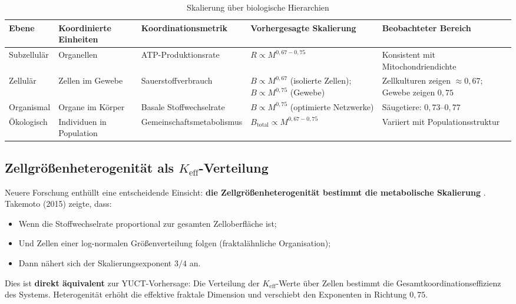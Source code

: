\documentclass[12pt]{article}
\newcommand{\Keff}{K_{\mathrm{eff}}}
\begin{document}
	\begin{table}[htbp]
		\centering
		\caption{Skalierung über biologische Hierarchien}
		\label{tab:hierarchical-scaling}
		\begin{tabular}{p{3cm} p{3cm} p{3.5cm} p{2.5cm} p{3cm}}
			\toprule
			\textbf{Ebene} & \textbf{Koordinierte Einheiten} & \textbf{Koordinationsmetrik} & \textbf{Vorhergesagte Skalierung} & \textbf{Beobachteter Bereich} \\
			\midrule
			Subzellulär & Organellen & ATP-Produktionsrate & \(R \propto M^{0,67-0,75}\) & Konsistent mit Mitochondriendichte \cite{West2002} \\
			Zellulär & Zellen im Gewebe & Sauerstoffverbrauch & \(B \propto M^{0,67}\) (isolierte Zellen); \(B \propto M^{0,75}\) (Gewebe) & Zellkulturen zeigen \(\approx 0,67\); Gewebe zeigen \(0,75\) \cite{West2002} \\
			Organismal & Organe im Körper & Basale Stoffwechselrate & \(B \propto M^{0,75}\) (optimierte Netzwerke) & Säugetiere: \(0,73\)–\(0,77\) \cite{Kleiber1932} \\
			Ökologisch & Individuen in Population & Gemeinschaftsmetabolismus & \(B_{\text{total}} \propto M^{0,67-0,75}\) & Variiert mit Populationsstruktur \cite{Glazier2005} \\
			\bottomrule
		\end{tabular}
	\end{table}
	
	\subsection{Zellgrößenheterogenität als \(\Keff\)-Verteilung}
	
	Neuere Forschung enthüllt eine entscheidende Einsicht: \textbf{die Zellgrößenheterogenität bestimmt die metabolische Skalierung} \cite{Takemoto2015}. Takemoto (2015) zeigte, dass:
	\begin{itemize}
		\item Wenn die Stoffwechselrate proportional zur gesamten Zelloberfläche ist;
		\item Und Zellen einer log-normalen Größenverteilung folgen (fraktalähnliche Organisation);
		\item Dann nähert sich der Skalierungsexponent \(3/4\) an.
	\end{itemize}
	Dies ist \textbf{direkt äquivalent} zur YUCT-Vorhersage: Die Verteilung der \(\Keff\)-Werte über Zellen bestimmt die Gesamtkoordinationseffizienz des Systems. Heterogenität erhöht die effektive fraktale Dimension und verschiebt den Exponenten in Richtung \(0,75\).
	
\end{document}
